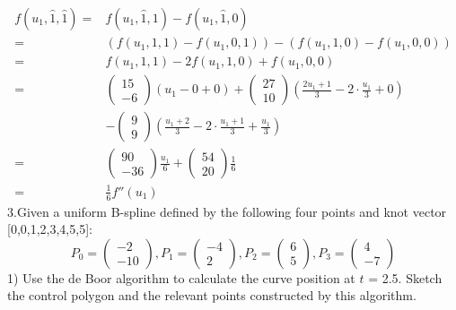 \documentclass{article}
\begin{document}
\begin{equation*}
	\begin{aligned}
		f(u_1,\hat{1},\hat{1})=&f(u_1,\hat{1},1)-f(u_1,\hat{1},0)\\
		=&(f(u_1,1,1)-f(u_1,0,1))-(f(u_1,1,0)-f(u_1,0,0))\\
		=&f(u_1,1,1)-2f(u_1,1,0)+f(u_1,0,0)\\
		=&\left(\begin{array}{c}	15\\-6 \end{array}\right)(u_1-0+0)+
		\left(\begin{array}{c}	27\\10 \end{array}\right)(\frac{2u_1+1}{3}-2\cdot\frac{u_1}{3}+0)\\
		&-
		\left(\begin{array}{c}	9\\9 \end{array}\right)(\frac{u_1+2}{3}-2\cdot\frac{u_1+1}{3}+\frac{u_1}{3})\\
		=&\left(\begin{array}{c} 90\\-36 \end{array}\right)\frac{u_1}{6}+\left(\begin{array}{c}	54\\20 \end{array}\right)\frac{1}{6}\\
		=&\frac{1}{6}f''(u_1)
	\end{aligned}
\end{equation*}
	3.Given a uniform B-spline defined by the following four points and knot vector
	[0,0,1,2,3,4,5,5]:\\
	$$P_0=\left(\begin{array}{c} -2\\-10 \end{array}\right),
	P_1=\left(\begin{array}{c}	-4\\2 \end{array}\right),
	P_2=\left(\begin{array}{c}	6\\5 \end{array}\right),
	P_3=\left(\begin{array}{c}	4\\-7 \end{array}\right)$$
	1) Use the de Boor algorithm to calculate the curve position at $t$ = 2.5. Sketch the 
	control polygon and the relevant points constructed by this algorithm.\\
\end{document}
